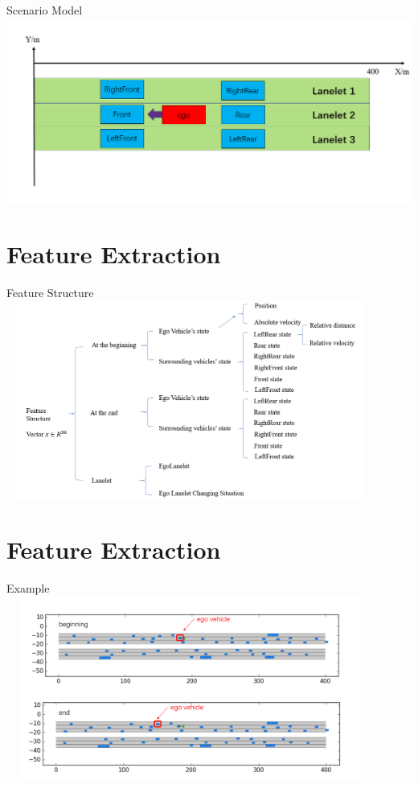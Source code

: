 \documentclass[shortpres]{beamer}
\begin{document}
\begin{frame}{Scenario Model}
    \includegraphics[height=0.6\textheight]{ScenarioModel.png}
\end{frame}

\section{Feature Extraction}

\begin{frame}{Feature Structure}
    \includegraphics[width=12cm,height=6.5cm]{Feature_Structure.png}
\end{frame}

\section{Feature Extraction}

\begin{frame}{Example}
    \includegraphics[width=12cm,height=6cm]{LaneletChangingExample.png}
\end{frame}
\end{document}
